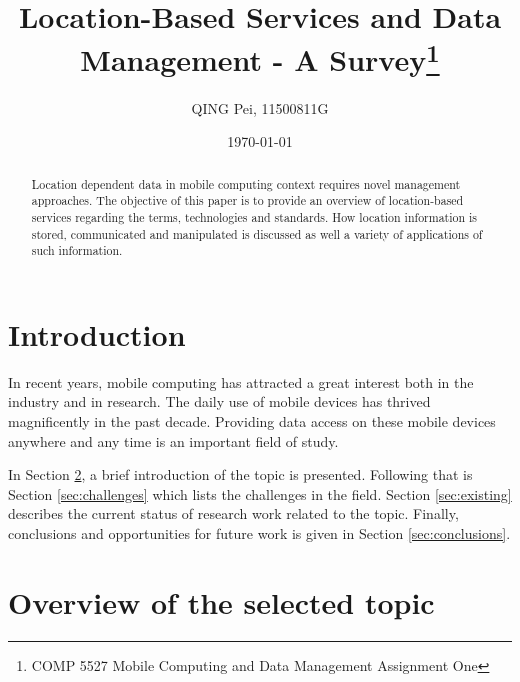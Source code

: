 \documentclass[12pt,a4paper,titlepage]{article}
\begin{document}
\title{Location-Based Services and Data Management - A Survey\footnote{COMP 5527 Mobile Computing and Data Management Assignment One}}
\author{QING Pei, 11500811G}
\date{\today}
% 

\maketitle

\begin{abstract}
Location dependent data in mobile computing context requires novel management approaches. The objective of this paper is to provide an overview of location-based services regarding the terms, technologies and standards. How location information is stored, communicated and manipulated is discussed as well a variety of applications of such information.
\end{abstract}


\section{Introduction} %
\label{sec:intro}
In recent years, mobile computing has attracted a great interest both in the industry and in research. The daily use of mobile devices has thrived magnificently in the past decade. Providing data access on these mobile devices anywhere and any time is an important field of study.

In Section \ref{sec:overview}, a brief introduction of the topic is presented. Following that is Section \ref{sec:challenges} which lists the challenges in the field. Section \ref{sec:existing} describes the current status of research work related to the topic. Finally, conclusions and opportunities for future work is given in Section \ref{sec:conclusions}.

\section{Overview of the selected topic} %
\label{sec:overview}
\end{document}
